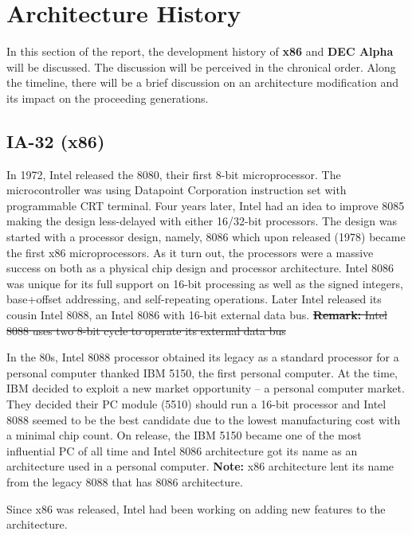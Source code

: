 \documentclass[letterpaper,10pt,titlepage]{article}
\begin{document}
\section{Architecture History}
In this section of the report, the development history of \textbf{x86} and
\textbf{DEC Alpha} will be discussed. The discussion will be perceived in 
the chronical order.  Along the timeline, there will be a brief discussion
on an architecture modification and its impact on the proceeding 
generations. 

\subsection{IA-32 (x86)}
In 1972, Intel released the 8080, their first 8-bit microprocessor.  The
microcontroller was using Datapoint Corporation instruction set with 
programmable CRT terminal. Four years later, Intel had an idea to improve
8085 making the design less-delayed with either 16/32-bit processors.
The design was started with a processor design, namely, 8086  
which upon released (1978) became the first x86 microprocessors. 
As it turn out, the processors were a massive success on both as a physical
chip design and processor architecture. Intel 8086 was unique for its full 
support on 16-bit processing as well as the signed integers, base+offset 
addressing, and self-repeating operations. Later Intel released its cousin
Intel 8088, an Intel 8086 with 16-bit external data bus. 
\sout{\textbf{Remark:} Intel 8088 uses two 8-bit cycle to operate its 
external data bus}
\par
In the 80s, Intel 8088 processor obtained its legacy as a standard processor
for a personal computer thanked IBM 5150, the first personal computer.
At the time, IBM decided to exploit a new market opportunity -- a personal 
computer market. They decided their PC module (5510) should run a 16-bit 
processor and Intel 8088 seemed to be the best candidate due to the 
lowest manufacturing cost with a minimal chip count. On release, the IBM 5150
became one of the most influential PC of all time and Intel 8086 architecture 
got its name as an architecture used in a personal computer.  
\textbf{Note:} x86 architecture lent its name from the legacy 8088 that has
8086 architecture.
\par
Since x86 was released, Intel had been working on adding new features to the
architecture. 
\end{document}
